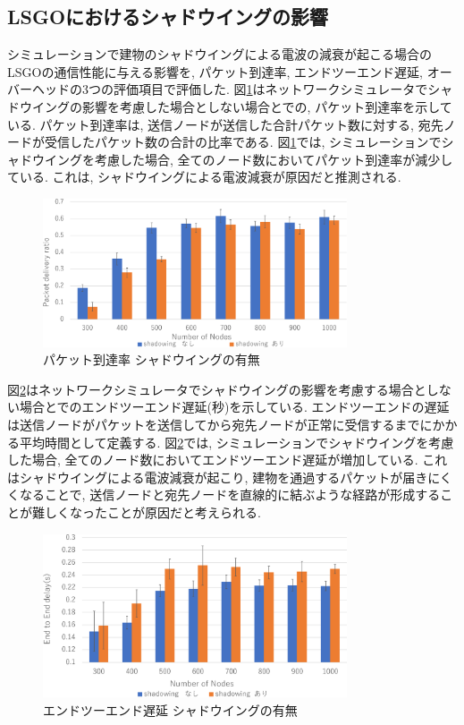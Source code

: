 \documentclass[technicalreport]{ieicej}
\begin{document}
\par

\subsection{LSGOにおけるシャドウイングの影響}
シミュレーションで建物のシャドウイングによる電波の減衰が起こる場合のLSGOの通信性能に与える影響を, パケット到達率, エンドツーエンド遅延, オーバーヘッドの3つの評価項目で評価した. 
図\ref{fig:PDR-shadowing}はネットワークシミュレータでシャドウイングの影響を考慮した場合としない場合とでの, パケット到達率を示している. パケット到達率は, 送信ノードが送信した合計パケット数に対する, 宛先ノードが受信したパケット数の合計の比率である. 図\ref{fig:PDR-shadowing}では, シミュレーションでシャドウイングを考慮した場合, 全てのノード数においてパケット到達率が減少している. これは, シャドウイングによる電波減衰が原因だと推測される.

\begin{figure}[!ht]
\centering
\includegraphics[width=90mm]{figures/PDR-shadowing.eps}
\caption{パケット到達率 シャドウイングの有無}
\label{fig:PDR-shadowing}
\end{figure}

図\ref{fig:Delay-shadowing}はネットワークシミュレータでシャドウイングの影響を考慮する場合としない場合とでのエンドツーエンド遅延(秒)を示している. エンドツーエンドの遅延は送信ノードがパケットを送信してから宛先ノードが正常に受信するまでにかかる平均時間として定義する. 図\ref{fig:Delay-shadowing}では, シミュレーションでシャドウイングを考慮した場合, 全てのノード数においてエンドツーエンド遅延が増加している. これはシャドウイングによる電波減衰が起こり, 建物を通過するパケットが届きにくくなることで, 送信ノードと宛先ノードを直線的に結ぶような経路が形成することが難しくなったことが原因だと考えられる. 

\begin{figure}[!ht]
\centering
\includegraphics[width=90mm]{figures/Delay-shadowing.eps}
\caption{エンドツーエンド遅延 シャドウイングの有無}
\label{fig:Delay-shadowing}
\end{figure}
\end{document}
